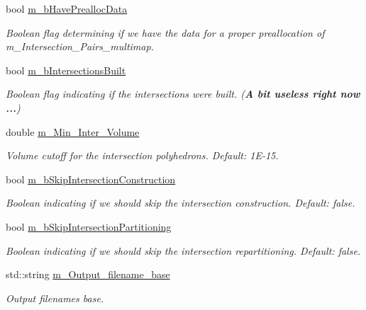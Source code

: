 \begin{DoxyCompactItemize}
bool \hyperlink{classcarl_1_1_intersection___search_ac3eae683cb64b5bd8b7c0430d6e7496f}{m\+\_\+b\+Have\+Prealloc\+Data}
\begin{DoxyCompactList}\small\item\em Boolean flag determining if we have the data for a proper preallocation of m\+\_\+\+Intersection\+\_\+\+Pairs\+\_\+multimap. \end{DoxyCompactList}\item 
bool \hyperlink{classcarl_1_1_intersection___search_aff13141f4d631c406fb12b78950f0e1e}{m\+\_\+b\+Intersections\+Built}
\begin{DoxyCompactList}\small\item\em Boolean flag indicating if the intersections were built. ({\bfseries A bit useless right now ...}) \end{DoxyCompactList}\item 
double \hyperlink{classcarl_1_1_intersection___search_af297d8e504705dbd69d80ca045b947ac}{m\+\_\+\+Min\+\_\+\+Inter\+\_\+\+Volume}
\begin{DoxyCompactList}\small\item\em Volume cutoff for the intersection polyhedrons. {\itshape Default\+:} 1\+E-\/15. \end{DoxyCompactList}\item 
bool \hyperlink{classcarl_1_1_intersection___search_aef626956ac007f4c737aba3f2f69f2de}{m\+\_\+b\+Skip\+Intersection\+Construction}
\begin{DoxyCompactList}\small\item\em Boolean indicating if we should skip the intersection construction. {\itshape Default\+:} false. \end{DoxyCompactList}\item 
bool \hyperlink{classcarl_1_1_intersection___search_aab4276c3ba5b247b46300de675a10cb4}{m\+\_\+b\+Skip\+Intersection\+Partitioning}
\begin{DoxyCompactList}\small\item\em Boolean indicating if we should skip the intersection repartitioning. {\itshape Default\+:} false. \end{DoxyCompactList}\item 
std\+::string \hyperlink{classcarl_1_1_intersection___search_a5f8d2ac04fc72c209ec92958552e41f5}{m\+\_\+\+Output\+\_\+filename\+\_\+base}
\begin{DoxyCompactList}\small\item\em Output filenames base. \end{DoxyCompactList}\item 

\end{DoxyCompactItemize}
